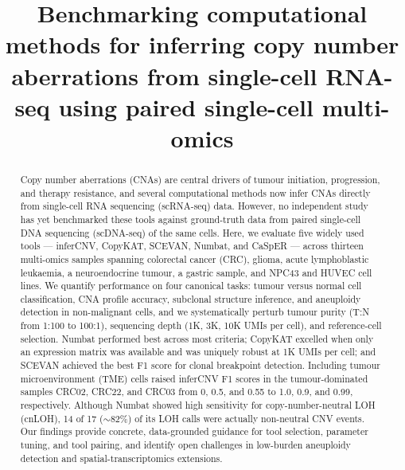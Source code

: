 \documentclass[11pt]{article}
\title{Benchmarking computational methods for inferring copy number
aberrations from single-cell RNA-seq using paired single-cell multi-omics}
\author{}
\date{}
\begin{document}
\maketitle

\begin{abstract}
Copy number aberrations (CNAs) are central drivers of tumour initiation,
progression, and therapy resistance, and several computational methods now
infer CNAs directly from single-cell RNA sequencing (scRNA-seq) data.
However, no independent study has yet benchmarked these tools against
ground-truth data from paired single-cell DNA sequencing (scDNA-seq) of the
same cells. Here, we evaluate five widely used tools --- inferCNV, CopyKAT,
SCEVAN, Numbat, and CaSpER --- across thirteen multi-omics samples spanning
colorectal cancer (CRC), glioma, acute lymphoblastic leukaemia, a
neuroendocrine tumour, a gastric sample, and NPC43 and HUVEC cell lines. We
quantify performance on four canonical tasks: tumour versus normal cell
classification, CNA profile accuracy, subclonal structure inference, and
aneuploidy detection in non-malignant cells, and we systematically perturb
tumour purity (T:N from 1:100 to 100:1), sequencing depth (1K, 3K, 10K UMIs
per cell), and reference-cell selection. Numbat performed best across most
criteria; CopyKAT excelled when only an expression matrix was available and
was uniquely robust at 1K UMIs per cell; and SCEVAN achieved the best F1 score
for clonal breakpoint detection. Including tumour microenvironment (TME) cells
raised inferCNV F1 scores in the tumour-dominated samples CRC02, CRC22, and
CRC03 from 0, 0.5, and 0.55 to 1.0, 0.9, and 0.99, respectively. Although
Numbat showed high sensitivity for copy-number-neutral LOH (cnLOH), 14 of 17
($\sim$82\%) of its LOH calls were actually non-neutral CNV events. Our
findings provide concrete, data-grounded guidance for tool selection,
parameter tuning, and tool pairing, and identify open challenges in low-burden
aneuploidy detection and spatial-transcriptomics extensions.
\end{abstract}
\end{document}
